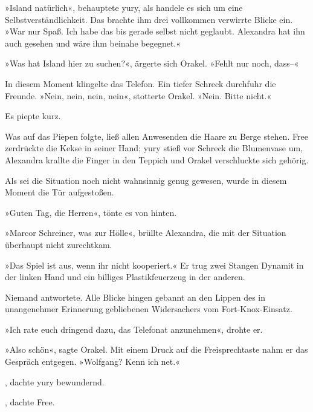 »Island natürlich«, behauptete yury, als handele es sich um eine Selbstverständlichkeit. Das brachte ihm drei vollkommen verwirrte Blicke ein. »War nur Spaß. Ich habe das bis gerade selbst nicht geglaubt. Alexandra hat ihn auch gesehen und wäre ihm beinahe begegnet.«

»Was hat Island hier zu suchen?«, ärgerte sich Orakel. »Fehlt nur noch, dass–«

In diesem Moment klingelte das Telefon. Ein tiefer Schreck durchfuhr die Freunde. »Nein, nein, nein, nein«, stotterte Orakel. »Nein. Bitte nicht.«

 Es piepte kurz.

Was auf das Piepen folgte, ließ allen Anwesenden die Haare zu Berge stehen. Free zerdrückte die Kekse in seiner Hand; yury stieß vor Schreck die Blumenvase um, Alexandra krallte die Finger in den Teppich und Orakel verschluckte sich gehörig.


Als sei die Situation noch nicht wahnsinnig genug gewesen, wurde in diesem Moment die Tür aufgestoßen.

»Guten Tag, die Herren«, tönte es von hinten.

»Marcor Schreiner, was zur Hölle«, brüllte Alexandra, die mit der Situation überhaupt nicht zurechtkam.

»Das Spiel ist aus, wenn ihr nicht kooperiert.« Er trug zwei Stangen Dynamit in der linken Hand und ein billiges Plastikfeuerzeug in der anderen.

Niemand antwortete. Alle Blicke hingen gebannt an den Lippen des in unangenehmer Erinnerung gebliebenen Widersachers vom Fort-Knox-Einsatz.

»Ich rate euch dringend dazu, das Telefonat anzunehmen«, drohte er.

»Also schön«, sagte Orakel. Mit einem Druck auf die Freisprechtaste nahm er das Gespräch entgegen. »Wolfgang? Kenn ich net.«

, dachte yury bewundernd.

, dachte Free.

